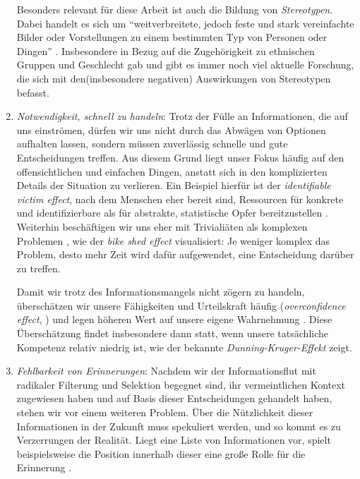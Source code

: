 \begin{enumerate}
	Besonders relevant für diese Arbeit ist auch die Bildung von \emph{Stereotypen}.
	Dabei handelt es sich um ``weitverbreitete, jedoch feste und stark vereinfachte Bilder oder Vorstellungen zu einem bestimmten Typ von Personen oder Dingen'' \citep[Übers. d. Verf.]{bordalo2016stereotypes}.
	Insbesondere in Bezug auf die Zugehörigkeit zu ethnischen Gruppen \citep{brigham1971ethnic, guichard1977ethnic, mastro2009effects} und Geschlecht \citep{hoffman1990gender, heilman2012gender, haines2016times, ellemers2018gender} gab und gibt es immer noch viel aktuelle Forschung, die sich mit den\break (insbesondere negativen) Auswirkungen von Stereotypen befasst.
	
	\item \emph{Notwendigkeit, schnell zu handeln}: Trotz der Fülle an Informationen, die auf uns einströmen, dürfen wir uns nicht durch das Abwägen von Optionen aufhalten lassen, sondern müssen zuverlässig schnelle und gute Entscheidungen treffen.
	Aus diesem Grund liegt unser Fokus häufig auf den offensichtlichen und einfachen Dingen, anstatt sich in den komplizierten Details der Situation zu verlieren.
	Ein Beispiel hierfür ist der \emph{identifiable victim effect}, nach dem Menschen eher bereit sind, Ressourcen für konkrete und identifizierbare als für abstrakte, statistische Opfer bereitzustellen \citep{jenni1997explaining}.
	Weiterhin beschäftigen wir uns eher mit Trivialiäten als komplexen Problemen \citep{parkinson1958parkinson}, wie der \emph{bike shed effect} visualisiert:
	Je weniger komplex das Problem, desto mehr Zeit wird dafür aufgewendet, eine Entscheidung darüber zu treffen.
	
	Damit wir trotz des Informationsmangels nicht zögern zu handeln, überschätzen wir unsere Fähigkeiten und Urteilskraft häufig (\emph{overconfidence effect}, \cite{moore2008trouble}) und legen höheren Wert auf unsere eigene Wahrnehmung \citep{ross1979egocentric}.
	Diese Überschätzung findet insbesondere dann statt, wenn unsere tatsächliche Kompetenz relativ niedrig ist, wie der bekannte \emph{Dunning-Kruger-Effekt} \citep{dunning2011dunning} zeigt.
	
	\item \emph{Fehlbarkeit von Erinnerungen}: Nachdem wir der Informationsflut mit radikaler Filterung und Selektion begegnet sind, ihr vermeintlichen Kontext zugewiesen haben und auf Basis dieser Entscheidungen gehandelt haben, stehen wir vor einem weiteren Problem.
	Über die Nützlichkeit dieser Informationen in der Zukunft muss spekuliert werden, und so kommt es zu Verzerrungen der Realität.
	Liegt eine Liste von Informationen vor, spielt beispielsweise die Position innerhalb dieser eine große Rolle für die Erinnerung \citep{murdock1962serial, phillips1967effects}.
	

\end{enumerate}
